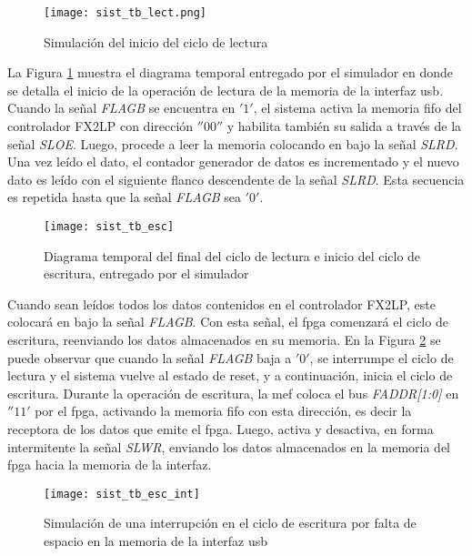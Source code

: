 	\begin{figure}[t]
		\centering
		\texttt{[image: sist\_tb\_lect.png]}
		\caption{Simulación del inicio del ciclo de lectura}
		\label{test:tb:lect}
	\end{figure}

	La Figura \ref{test:tb:lect} muestra el diagrama temporal entregado por el simulador en donde se detalla el inicio de la operación de lectura de la memoria de la interfaz \acrshort{usb}. Cuando la señal \textit{FLAGB} se encuentra en $'1'$, el sistema activa la memoria \acrshort{fifo} del controlador FX2LP con dirección $''00''$ y habilita también su salida a través de la señal \textit{SLOE}. Luego, procede a leer la memoria colocando en bajo la señal \textit{SLRD}. Una vez leído el dato, el contador generador de datos es incrementado y el nuevo dato es leído con el siguiente flanco descendente de la señal \textit{SLRD}. Esta secuencia es repetida hasta que la señal \textit{FLAGB} sea $'0'$.
	
	\begin{figure}[b]
		\centering
		\texttt{[image: sist\_tb\_esc]}
		\caption{Diagrama temporal del final del ciclo de lectura e inicio del ciclo de escritura, entregado por el simulador}
		\label{test:tb:escr}
	\end{figure}

	Cuando sean leídos todos los datos contenidos en el controlador FX2LP, este colocará en bajo la señal \textit{FLAGB}. Con esta señal,
	el \acrshort{fpga} comenzará el ciclo de escritura, reenviando los datos almacenados en su memoria. En la Figura \ref{test:tb:escr} se puede observar que cuando la señal \textit{FLAGB} baja a $'0'$, se interrumpe el ciclo de lectura y el sistema vuelve al estado de reset, y a continuación, inicia el ciclo de escritura. Durante la operación de escritura, la \acrshort{mef} coloca el bus \textit{FADDR[1:0]} en $''11'$ por el \acrshort{fpga}, activando la memoria \acrshort{fifo} con esta dirección, es decir la receptora de los datos que emite el \acrshort{fpga}. Luego, activa y desactiva, en forma intermitente la señal \textit{SLWR}, enviando los datos almacenados en la memoria del \acrshort{fpga} hacia la memoria de la interfaz.
	
	\begin{figure}[t]
		\centering
		\texttt{[image: sist\_tb\_esc\_int]}
		\caption{Simulación de una interrupción en el ciclo de escritura por falta de espacio en la memoria de la interfaz \acrshort{usb}}
		\label{test:tb:int}
	\end{figure}
	
